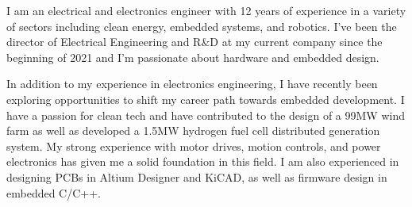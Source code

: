 \documentclass[12pt, letterpaper]{awesome-cv} %
\begin{document}
\makecvheader %

\makelettertitle %


\begin{cvletter}



    I am an electrical and electronics engineer with 12 years of experience in a variety of sectors including clean energy, embedded systems, and robotics. I've been the director of Electrical Engineering and R\&D at my current company since the beginning of 2021 and I'm passionate about hardware and embedded design.

    In addition to my experience in electronics engineering, I have recently been exploring opportunities to shift my career path towards embedded development. I have a passion for clean tech and have contributed to the design of a 99MW wind farm as well as developed a 1.5MW hydrogen fuel cell distributed generation system. My strong experience with motor drives, motion controls, and power electronics has given me a solid foundation in this field. I am also experienced in designing PCBs in Altium Designer and KiCAD, as well as firmware design in embedded C/C++.






\end{cvletter}
\end{document}
